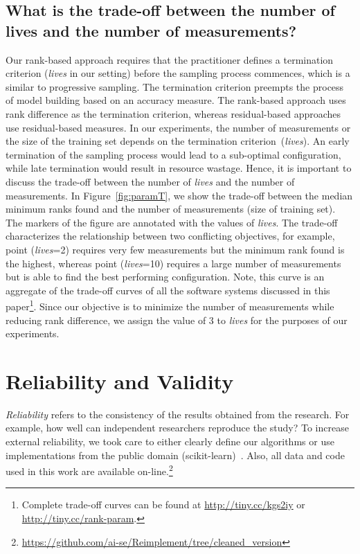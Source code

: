\subsection{What is the trade-off between the number of lives and the number of measurements?}\label{sec:tradeoff}
Our rank-based approach requires that the practitioner defines a termination criterion (\textit{lives} in our setting) before the sampling process commences, which is a similar to progressive sampling. The termination criterion preempts the process of model building based on an accuracy measure. The rank-based approach uses rank difference as the termination criterion, whereas residual-based approaches use residual-based measures. In our experiments, the number of measurements or the size of the training set depends on the termination criterion~(\textit{lives}). An early termination of the sampling process would lead to a sub-optimal configuration, while late termination would result in resource wastage. Hence, it is important to discuss the trade-off between the number of \textit{lives} and the number of measurements.
In Figure~\ref{fig:paramT}, we show the trade-off between the median minimum ranks found and the number of measurements (size of training set). The markers of the figure are annotated with the values of \textit{lives}. The trade-off characterizes the relationship between two conflicting objectives, for example, point (\textit{lives}=2) requires very few measurements but the minimum rank found is the highest, whereas point (\textit{lives}=10) requires a large number of measurements but is able to find the best performing configuration. Note, this curve is an aggregate of the trade-off curves of all the software systems discussed in this paper\footnote{Complete trade-off curves can be found at \url{http://tiny.cc/kgs2iy} or \url{http://tiny.cc/rank-param}.}.  Since our objective is to minimize the number of measurements while reducing rank difference, we assign the value of $3$ to \textit{lives} for the purposes of our experiments.



\section{Reliability and Validity} 
{\em Reliability} refers to the consistency of the results obtained
from the research.  For example,   how well can independent researchers reproduce the study? To increase external
reliability, we took care to either  clearly define our
algorithms or use implementations from the public domain
(scikit-learn)~\cite{scikit-learn}. Also, all data and code used in this work are available
on-line.\footnote{ 
\url{https://github.com/ai-se/Reimplement/tree/cleaned_version}}


